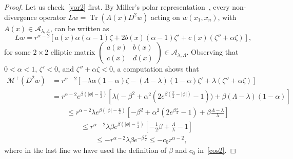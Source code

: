 \documentclass[letter,11pt]{amsart}
\newcommand{\tr}[1]{\operatorname{Tr}(#1)}
\newcommand{\ellmat}{\mathcal{A}_{\lambda, \Lambda}}
\newcommand{\mcal}{\mathcal{M}}
\theoremstyle{definition}
\numberwithin{equation}{section}
\begin{document}
\begin{proof}
Let us check~\eqref{yor2} first.
By Miller's polar representation~\cite{Miller}, every non-divergence operator
$L w = \tr{A(x)D^2 w}$
acting on $w(x_1, x_n)$, with $A(x) \in \ellmat$, can be written as
\[
L w = r^{\alpha-2} \left[a(x) \alpha(\alpha-1) \zeta + 2 b(x) (\alpha-1) \zeta' + c(x) (\zeta'' + \alpha \zeta) \right],
\]
for some $2\times2$ elliptic matrix 
$\left(\begin{smallmatrix}
a(x) & b(x) \\ c(x) & d(x)
\end{smallmatrix}\right) \in \ellmat$.
Observing that
$0 < \alpha < 1$, $\zeta' < 0$, and $\zeta'' + \alpha \zeta < 0$,
a computation shows that
\[
\begin{split}
\mcal^{+}(D^2 w) &= r^{\alpha-2} \left[ -\lambda \alpha (1-\alpha) \zeta - (\Lambda-\lambda) (1-\alpha) \zeta' + \lambda (\zeta'' + \alpha \zeta)  \right]\\
&= r^{\alpha-2} e^{\beta(|\phi| - \frac{\pi}{2})}  \left[ \lambda \big(- \beta^2 + \alpha^2 (2 e^{\beta(\frac{\pi}{2}-|\phi|)}- 1)\big) + \beta (\Lambda-\lambda) (1-\alpha) \right]\\
& \qquad \leq r^{\alpha-2} \lambda e^{\beta(|\phi| - \frac{\pi}{2})}  \left[- \beta^2 + \alpha^2 (2 e^{\beta\frac{\pi}{2}}- 1) + \beta \frac{\Lambda-\lambda}{\lambda} \right]\\
&\qquad \qquad \leq r^{\alpha-2} \lambda \beta e^{\beta(|\phi| - \frac{\pi}{2})}  \left[ - \frac{1}{2}\beta + \frac{\Lambda}{\lambda}-1 \right]\\
&\qquad \qquad \qquad \leq  - r^{\alpha-2} \lambda \beta e^{- \beta\frac{\pi}{2}} \leq - c_0 r^{\alpha-2},
\end{split}
\]
where in the last line we have used the definition of $\beta$ and $c_0$ in~\eqref{cos2}.

\medskip


\end{proof}
\end{document}
